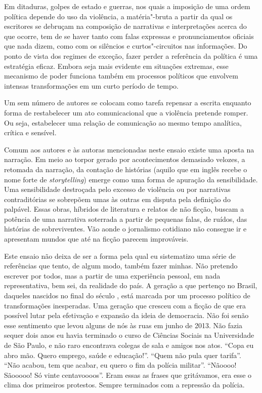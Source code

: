 Em ditaduras, golpes de estado e guerras, nos quais a imposição de uma
ordem política depende do uso da violência, a matéria"-bruta a partir da
qual os escritores se debruçam na composição de narrativas e interpretações acerca do que ocorre, tem de se
haver tanto com falas expressas e pronunciamentos oficiais que nada
dizem, como com os silêncios e curtos"-circuitos nas informações. Do
ponto de vista dos regimes de exceção, fazer perder a referência da
política é uma estratégia eficaz. Embora seja mais evidente em situações
extremas, esse mecanismo de poder funciona também em processos políticos que
envolvem intensas transformações em um curto período de tempo.

Um sem número de autores se colocam como tarefa repensar a
escrita enquanto forma de restabelecer um ato comunicacional que a violência
pretende romper. Ou seja, estabelecer uma relação de comunicação ao
mesmo tempo analítica, crítica e sensível.

Comum aos autores e às autoras mencionadas neste ensaio existe uma aposta na
narração. Em meio ao torpor gerado por acontecimentos demasiado
velozes, a retomada da narração, da contação de histórias (aquilo que em
inglês recebe o nome forte de \emph{storytelling}) emerge como uma forma
de apuração da sensibilidade. Uma sensibilidade destroçada pelo excesso %
de violência ou por narrativas contraditórias se sobrepõem
umas às outras em disputa pela definição do palpável. Essas obras,
híbridos de literatura e relatos de não ficção, buscam a potência de uma
narrativa soterrada a partir de pequenas falas, de ruídos, das histórias
de sobreviventes. Vão aonde o jornalismo cotidiano não consegue ir e
apresentam mundos que até na ficção parecem improváveis.

\asterisc

Este ensaio não deixa de ser a forma pela qual eu
sistematizo uma série de referências que tento, de algum modo, também
fazer minhas. Não pretendo escrever por todos, mas a partir de uma experiência pessoal, em nada representativa, bem sei, da realidade do país. A geração a que pertenço no Brasil, daqueles nascidos no
final do século , está marcada por um processo político de
transformações inesperadas. Uma geração que cresceu com a ficção de que
era possível lutar pela efetivação e expansão da ideia de democracia.
Não foi senão esse sentimento que levou alguns de nós às ruas em junho
de 2013. Não fazia sequer dois anos eu havia terminado o curso de Ciências
Sociais na Universidade de São Paulo, e não raro encontrava colegas de
sala e amigos nos atos. ``Copa eu abro mão. Quero emprego, saúde e
educação!''. ``Quem não pula quer tarifa''. ``Não acabou, tem que
acabar, eu quero o fim da polícia militar''. ``Nãoooo! Sãooooo! Só vinte
centavoooos''. Eram essas as frases que gritávamos, era esse o clima dos
primeiros protestos. Sempre terminados com a repressão da polícia.

